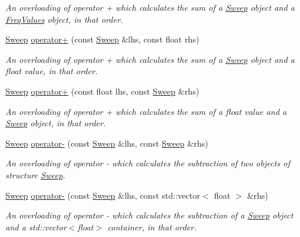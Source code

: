 \begin{DoxyCompactItemize}
\begin{DoxyCompactList}\small\item\em An overloading of operator + which calculates the sum of a {\itshape \hyperlink{structSweep}{Sweep}} object and a {\itshape \hyperlink{structFreqValues}{Freq\+Values}} object, in that order. \end{DoxyCompactList}\item 
\hyperlink{structSweep}{Sweep} \hyperlink{structSweep_ae8dce428f848644d0a68cc8309f88ebf}{operator+} (const \hyperlink{structSweep}{Sweep} \&lhs, const float rhs)
\begin{DoxyCompactList}\small\item\em An overloading of operator + which calculates the sum of a {\itshape \hyperlink{structSweep}{Sweep}} object and a {\itshape float} value, in that order. \end{DoxyCompactList}\item 
\hyperlink{structSweep}{Sweep} \hyperlink{structSweep_ac0d73d5e8e3aab8f87c9815588b66821}{operator+} (const float lhs, const \hyperlink{structSweep}{Sweep} \&rhs)
\begin{DoxyCompactList}\small\item\em An overloading of operator + which calculates the sum of a {\itshape float} value and a {\itshape \hyperlink{structSweep}{Sweep}} object, in that order. \end{DoxyCompactList}\item 
\hyperlink{structSweep}{Sweep} \hyperlink{structSweep_a8f704b31d015e4d81d25d3fceca1e2f1}{operator-\/} (const \hyperlink{structSweep}{Sweep} \&lhs, const \hyperlink{structSweep}{Sweep} \&rhs)
\begin{DoxyCompactList}\small\item\em An overloading of operator -\/ which calculates the subtraction of two objects of structure {\itshape \hyperlink{structSweep}{Sweep}}. \end{DoxyCompactList}\item 
\hyperlink{structSweep}{Sweep} \hyperlink{structSweep_a8b2585969a3c379f744b662fb3bea749}{operator-\/} (const \hyperlink{structSweep}{Sweep} \&lhs, const std\+::vector$<$ float $>$ \&rhs)
\begin{DoxyCompactList}\small\item\em An overloading of operator -\/ which calculates the subtraction of a {\itshape \hyperlink{structSweep}{Sweep}} object and a {\ttfamily std\+::vector$<$float$>$} container, in that order. \end{DoxyCompactList}\item 

\end{DoxyCompactItemize}
